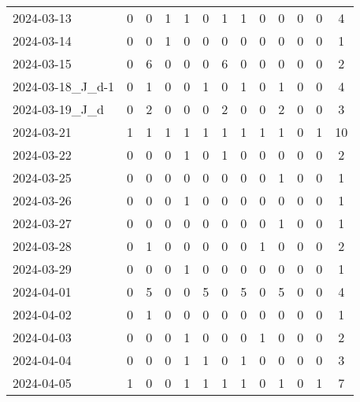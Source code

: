 \documentclass[dvipdfmx,oneside]{article}
\begin{document}
\begin{longtable}{lcccccccccccc}
        2024-03-13 &     0 &     0 &     1 &     1 &     0 &     1 &     1 &     0 &     0 &     0 &     0 &      4 \\
        2024-03-14 &     0 &     0 &     1 &     0 &     0 &     0 &     0 &     0 &     0 &     0 &     0 &      1 \\
        2024-03-15 &     0 &     6 &     0 &     0 &     0 &     6 &     0 &     0 &     0 &     0 &     0 &      2 \\
2024-03-18\_J\_d-1 &     0 &     1 &     0 &     0 &     1 &     0 &     1 &     0 &     1 &     0 &     0 &      4 \\
  2024-03-19\_J\_d &     0 &     2 &     0 &     0 &     0 &     2 &     0 &     0 &     2 &     0 &     0 &      3 \\
        2024-03-21 &     1 &     1 &     1 &     1 &     1 &     1 &     1 &     1 &     1 &     0 &     1 &     10 \\
        2024-03-22 &     0 &     0 &     0 &     1 &     0 &     1 &     0 &     0 &     0 &     0 &     0 &      2 \\
        2024-03-25 &     0 &     0 &     0 &     0 &     0 &     0 &     0 &     0 &     1 &     0 &     0 &      1 \\
        2024-03-26 &     0 &     0 &     0 &     1 &     0 &     0 &     0 &     0 &     0 &     0 &     0 &      1 \\
        2024-03-27 &     0 &     0 &     0 &     0 &     0 &     0 &     0 &     0 &     1 &     0 &     0 &      1 \\
        2024-03-28 &     0 &     1 &     0 &     0 &     0 &     0 &     0 &     1 &     0 &     0 &     0 &      2 \\
        2024-03-29 &     0 &     0 &     0 &     1 &     0 &     0 &     0 &     0 &     0 &     0 &     0 &      1 \\
        2024-04-01 &     0 &     5 &     0 &     0 &     5 &     0 &     5 &     0 &     5 &     0 &     0 &      4 \\
        2024-04-02 &     0 &     1 &     0 &     0 &     0 &     0 &     0 &     0 &     0 &     0 &     0 &      1 \\
        2024-04-03 &     0 &     0 &     0 &     1 &     0 &     0 &     0 &     1 &     0 &     0 &     0 &      2 \\
        2024-04-04 &     0 &     0 &     0 &     1 &     1 &     0 &     1 &     0 &     0 &     0 &     0 &      3 \\
        2024-04-05 &     1 &     0 &     0 &     1 &     1 &     1 &     1 &     0 &     1 &     0 &     1 &      7 \\

\end{longtable}
\end{document}
